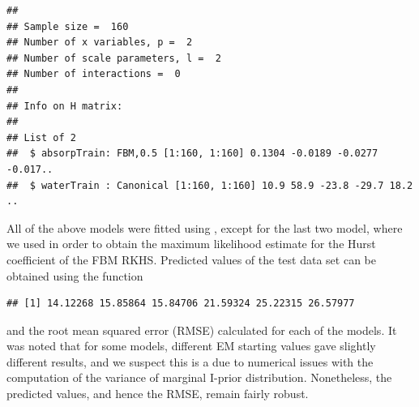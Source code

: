 \begin{knitrout}
\color{fgcolor}\begin{kframe}
\begin{alltt}
 \hlkwb{<-} \hlstd{(} 
                \hlstd{=} \hlstd{(} \hlstd{=} \hlstd{(}\hlstd{,} \hlstd{))))}
\end{alltt}
\end{kframe}
\end{knitrout}
\begin{knitrout}
\color{fgcolor}\begin{kframe}
\begin{verbatim}
## 
## Sample size =  160 
## Number of x variables, p =  2 
## Number of scale parameters, l =  2 
## Number of interactions =  0 
## 
## Info on H matrix:
## 
## List of 2
##  $ absorpTrain: FBM,0.5 [1:160, 1:160] 0.1304 -0.0189 -0.0277 -0.017..
##  $ waterTrain : Canonical [1:160, 1:160] 10.9 58.9 -23.8 -29.7 18.2 ..
\end{verbatim}
\end{kframe}
\end{knitrout}



All of the above models were fitted using , except for the last two model, where we used  in order to obtain the maximum likelihood estimate for the Hurst coefficient of the FBM RKHS. Predicted values of the test data set can be obtained using the  function

\begin{knitrout}
\color{fgcolor}\begin{kframe}
\begin{alltt}
 \hlkwb{<-}  
\end{alltt}
\begin{verbatim}
## [1] 14.12268 15.85864 15.84706 21.59324 25.22315 26.57977
\end{verbatim}
\end{kframe}
\end{knitrout}

and the root mean squared error (RMSE) calculated for each of the models. It was noted that for some models, different EM starting values gave slightly different results, and we suspect this is a due to numerical issues with the computation of the variance of marginal I-prior distribution. Nonetheless, the predicted values, and hence the RMSE, remain fairly robust.




